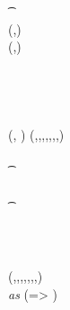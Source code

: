 \begin{figure}
\begin{center}
{\begin{varwidth}{\textwidth}
{            \t \pcreturn \cnstFalsum \\
            (\funStar{\varBlindingFactorBob},\varNonceBob) \sample \cnstIntegersPrimeWithoutZero{\varPrime} \\
            (\varCoinOutBob,\varProofBob) \opFunResult \procCreateCoin{\varFundValue}{\funStar{\varBlindingFactorBob}} \\
            \varSecKeyBob \opAssign \funStar{\varBlindingFactorBob} \\
            \varSigContext \opFunResult \procSetupCtx{\varSigContext}{\funGen{\varSecKeyBob}}{\funGen{\varNonceBob}} \\
            \varSigBob \opFunResult {} \\
            \varPreTx \opFunResult \procCreatePreTx{\varMsg}{\varInputs}{\varOutputs \opConc \varCoinOutBob}{\varProofs \opConc \varProofBob}{\varSigContext}{\varCommits \opConc \funGen{\varSecKeyBob}}{\varSigBob}{\varTime} \\
            \pcreturn (\varPreTx, \funStar{\varBlindingFactorBob})
            }
            \procedure[linenumbering]{$\procFinTx{\varPreTx}{\varSecKeyAlice}{\varNonceAlice}$} {
            (\varMsg,\varInputs,\varOutputs,\varProofs,\varSigContext,\varCommits,\varSigBob,\varTime) \opFunResult \varPreTx \\
            \pcif \procVerfProof{\varProofs[1]}{\varOutputs[1]}  \\
            \t \pcreturn \cnstFalsum \\
            \pcif \procVerfPtSig{\varSigBob}{\varMsg}{\varCommits[1]}  \\
            \t \pcreturn \cnstFalsum \\
            \varSigAlice \opFunResult \procSignPrt{\varMsg}{\varSecKeyAlice}{\varNonceAlice}{\varSigContext} \\
            \varSigFin \opFunResult \procFinSig{\varSigAlice}{\varSigBob} \\
            \varTx \opFunResult \procCreatePreTx{\varMsg}{\varInputs}{\varOutputs}{\varProofs}{\varSigContext}{\varCommits}{\varSigFin}{\varTime} \\
            \pcreturn \varTx
            }
            \procedure[linenumbering]{$\procVerfTx{\varTx}$} {
            (\varMsg,\varInputs,\varOutputs,\varProofs,\varSigContext,\varCommits,\varSignature,\varTime) \opFunResult \varTx \\
            \pcforeach \varOutputs \textit{ as } (\varIterator => \varCoinOut) \\
}
\end{varwidth}}
\end{center}
\end{figure}
